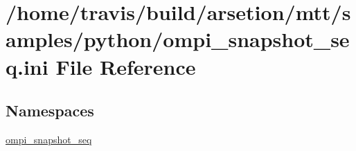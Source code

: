 \hypertarget{ompi__snapshot__seq_8ini}{\section{/home/travis/build/arsetion/mtt/samples/python/ompi\-\_\-snapshot\-\_\-seq.ini File Reference}
\label{ompi__snapshot__seq_8ini}
}
\subsection*{Namespaces}
\begin{DoxyCompactItemize}
\item 
\hyperlink{namespaceompi__snapshot__seq}{ompi\-\_\-snapshot\-\_\-seq}
\end{DoxyCompactItemize}
